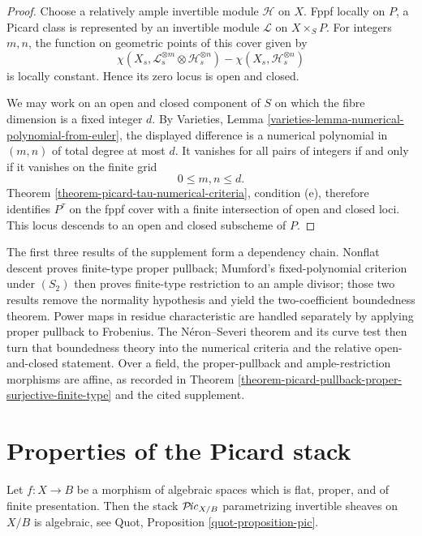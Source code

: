 \begin{proof}
Choose a relatively ample invertible module $\mathcal{H}$ on $X$. Fppf
locally on $P$, a Picard class is represented by an invertible module
$\mathcal{L}$ on $X \times_S P$. For integers $m, n$, the function on geometric
points of this cover given by
$$
\chi(X_s,\mathcal{L}_s^{\otimes m} \otimes \mathcal{H}_s^{\otimes n})
- \chi(X_s,\mathcal{H}_s^{\otimes n})
$$
is locally constant. Hence its zero locus is open and closed.

We may work on an open and closed component of $S$ on which the fibre
dimension is a fixed integer $d$. By Varieties, Lemma
\ref{varieties-lemma-numerical-polynomial-from-euler}, the displayed
difference is a numerical polynomial in $(m, n)$ of total degree at most
$d$. It vanishes for all pairs of integers if and only if it vanishes on the
finite grid
$$
0 \leq m, n \leq d.
$$
Theorem \ref{theorem-picard-tau-numerical-criteria}, condition (e), therefore
identifies $P^\tau$ on the fppf cover with a finite intersection of open and
closed loci. This locus descends to an open and closed subscheme of $P$.
\end{proof}

\begin{remark}
\label{remark-picard-supplement-proof-architecture}
The first three results of the supplement form a dependency chain. Nonflat
descent proves finite-type proper pullback; Mumford's fixed-polynomial
criterion under $(S_2)$ then proves finite-type restriction to an ample
divisor; those two results remove the normality hypothesis and yield the
two-coefficient boundedness theorem. Power maps in residue characteristic
are handled separately by applying proper pullback to Frobenius. The
N\'eron--Severi theorem and its curve test then turn that boundedness theory
into the numerical criteria and the relative open-and-closed statement.
Over a field, the proper-pullback and ample-restriction morphisms are affine,
as recorded in Theorem
\ref{theorem-picard-pullback-proper-surjective-finite-type} and the cited
supplement.
\end{remark}

\section{Properties of the Picard stack}
\label{section-picard-stack}

\noindent
Let $f : X \to B$ be a morphism of algebraic spaces which is flat,
proper, and of finite presentation. Then the stack
$\mathcal{P}\!\mathit{ic}_{X/B}$ parametrizing invertible sheaves on $X/B$
is algebraic, see Quot, Proposition \ref{quot-proposition-pic}.

